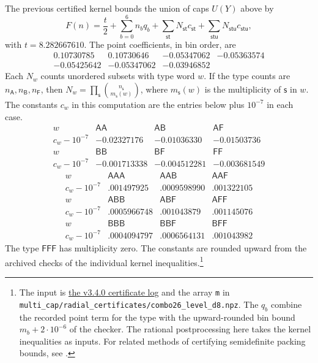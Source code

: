 The previous certified kernel bounds the union of caps \(U(Y)\)
above by
\[
 F(n)=\frac{t}{2}+\sum_{b=0}^6 n_bq_b
   +\sum_{\mathsf{st}}N_{\mathsf{st}}c_{\mathsf{st}}
   +\sum_{\mathsf{stu}}N_{\mathsf{stu}}c_{\mathsf{stu}},
\]
with \(t=8.282667610\). The point coefficients, in bin order, are
\[
 \begin{array}{rrrr}
  0.10730785 & 0.10730646 & -0.05347062 & -0.05363574\\
  -0.05425642 & -0.05347062 & -0.03946852 &
 \end{array}
\]
Each \(N_w\) counts unordered subsets with type word \(w\).
If the type counts are \(n_{\mathsf A},n_{\mathsf B},n_{\mathsf F}\),
then \(N_w=\prod_{\mathsf s}\binom{n_{\mathsf s}}{m_{\mathsf s}(w)}\),
where \(m_{\mathsf s}(w)\) is the multiplicity of \(\mathsf s\) in \(w\).
The constants \(c_w\) in this computation are the entries below
plus \(10^{-7}\) in each case.
\[
\begin{array}{c|rrr}
w & \mathsf{AA} & \mathsf{AB} & \mathsf{AF}\\
\hline
c_w-10^{-7} & -0.02327176 & -0.01036330 & -0.01503736\\
w & \mathsf{BB} & \mathsf{BF} & \mathsf{FF}\\
\hline
c_w-10^{-7} & -0.001713338 & -0.004512281 & -0.003681549
\end{array}
\]
\[
\begin{array}{c|rrr}
w & \mathsf{AAA} & \mathsf{AAB} & \mathsf{AAF}\\
\hline
c_w-10^{-7} & .001497925 & .0009598990 & .001322105\\
w & \mathsf{ABB} & \mathsf{ABF} & \mathsf{AFF}\\
\hline
c_w-10^{-7} & .0005966748 & .001043879 & .001145076\\
w & \mathsf{BBB} & \mathsf{BBF} & \mathsf{BFF}\\
\hline
c_w-10^{-7} & .0004094797 & .0006564131 & .001043982
\end{array}
\]
The type \(\mathsf{FFF}\) has multiplicity zero.
The constants are rounded upward from the archived checks
of the individual kernel inequalities.\footnote{The input is
\href{https://github.com/creelie/d4-voronoi-cells/blob/v3.4.0/multi_cap/runs/combo26_level_check.log}{the v3.4.0
certificate log} and the array \texttt{m} in
\texttt{multi\_cap/radial\_certificates/combo26\_level\_d8.npz}.
The \(q_b\) combine the recorded point term for the type with
the upward-rounded bin bound \(m_b+2\cdot10^{-6}\) of the
checker. The rational postprocessing here takes the
kernel inequalities as inputs. For related methods of
certifying semidefinite packing bounds, see \cite{DLM21}.}

